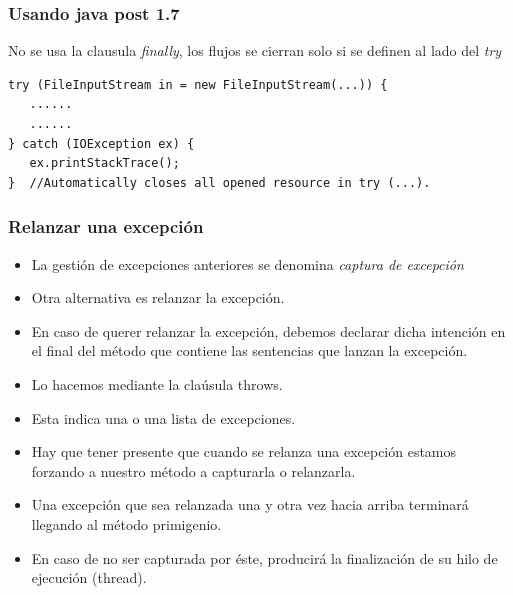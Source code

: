 \documentclass{beamer}
\begin{document}
\begin{frame}[fragile]
\frametitle{Usando java post 1.7}
No se usa la clausula \emph{finally}, los flujos se cierran solo si se definen al lado del \emph{try}
\begin{verbatim}
try (FileInputStream in = new FileInputStream(...)) {
   ......
   ......
} catch (IOException ex) {
   ex.printStackTrace();
}  //Automatically closes all opened resource in try (...).
\end{verbatim}
\end{frame}


\begin{frame}[fragile]
\frametitle{Relanzar una excepción}
\begin{itemize}[<+->]
\item La gestión de excepciones anteriores se denomina \emph{captura de excepción}
\item Otra alternativa es relanzar la excepción.
\item En caso de querer relanzar la excepción, debemos declarar dicha intención en el final del método que contiene las sentencias que lanzan la excepción.
\item Lo hacemos mediante la claúsula \alert{throws}.
\item Esta indica una o una lista de excepciones.
\item Hay que tener presente que cuando se relanza una excepción estamos forzando a nuestro método a capturarla o relanzarla.
\item Una excepción que sea relanzada una y otra vez hacia arriba terminará llegando al método primigenio.
\item En caso de no ser capturada por éste, producirá la finalización de su hilo de ejecución (thread).
\end{itemize}
\end{frame}
\end{document}
